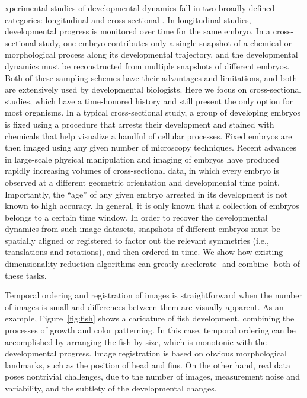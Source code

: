 \documentclass{pnastwo}
\begin{document}
\begin{article}
xperimental studies of developmental dynamics fall in two broadly defined categories: longitudinal and cross-sectional \cite{diggle2002analysis}.
%
In longitudinal studies, developmental progress is monitored over time for the same embryo.
%
In a cross-sectional study, one embryo contributes only a single snapshot of a chemical or morphological process along its developmental trajectory, and the developmental dynamics must be reconstructed from multiple snapshots of different embryos.
%
Both of these sampling schemes have their advantages and limitations, and both are extensively used by developmental biologists.
%
Here we focus on cross-sectional studies, which have a time-honored history and still present the only option for most organisms.
%
In a typical cross-sectional study, a group of developing embryos is fixed using a procedure that arrests their development and stained with chemicals that help visualize a handful of cellular processes.
%
Fixed embryos are then imaged using any given number of microscopy techniques.
%
Recent advances in large-scale physical manipulation and imaging of embryos have produced rapidly increasing volumes of cross-sectional data, in which every embryo is observed at a different geometric orientation and developmental time point.
%
Importantly, the ``age'' of any given embryo arrested in its development is not known to high accuracy.
%
In general, it is only known that a collection of embryos belongs to a certain time window.
%
In order to recover the developmental dynamics from such image datasets, snapshots of different embryos must be spatially aligned or registered to factor out the relevant symmetries (i.e., translations and rotations), and then ordered in time.
%
We show how existing dimensionality reduction algorithms can greatly accelerate -and combine- both of these tasks.

Temporal ordering and registration of images is straightforward when the number of images is small and differences between them are visually apparent.
%
As an example, Figure~\ref{fig:fish} shows a caricature of fish development, combining the processes of growth and color patterning.
%
In this case, temporal ordering can be accomplished by arranging the fish by size, which is monotonic with the developmental progress.
%
Image registration is based on obvious morphological landmarks, such as the position of head and fins.
%
On the other hand, real data poses nontrivial challenges, due to the number of images, measurement noise and variability, and the subtlety of the developmental changes.


\end{article}
\end{document}
